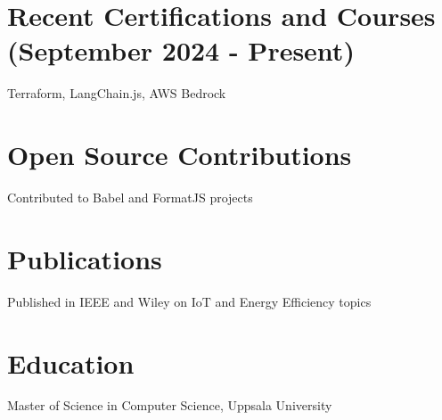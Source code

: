 \documentclass[13pt,a4paper,sans,colorlinks,urlcolor=violet,hyperindex,plainpages=false,bookmarksopen,bookmarksnumbered,pdfusetitle]{moderncv}
\begin{document}
\begin{minipage}[t]{0.65\textwidth}
  \section{Recent Certifications and Courses (September 2024 - Present)}
  Terraform, LangChain.js, AWS Bedrock

  \section{Open Source Contributions}
  Contributed to Babel and FormatJS projects

  \section{Publications}
  Published in IEEE and Wiley on IoT and Energy Efficiency topics

  \section{Education}
  Master of Science in Computer Science, Uppsala University

\end{minipage}
\end{document}
